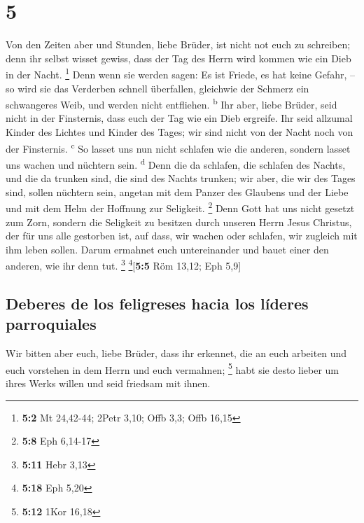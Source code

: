 \hypertarget{section-4}{%
\section{5}\label{section-4}}

 Von den Zeiten aber und Stunden, liebe Brüder, ist nicht
not euch zu schreiben;  denn ihr selbst wisset gewiss,
dass der Tag des Herrn wird kommen wie ein Dieb in der Nacht.
\footnote{\textbf{5:2} Mt 24,42-44; 2Petr 3,10; Offb 3,3; Offb 16,15}
 Denn wenn sie werden sagen: Es ist Friede, es hat keine
Gefahr, -- so wird sie das Verderben schnell überfallen, gleichwie der
Schmerz ein schwangeres Weib, und werden nicht entfliehen.
\textsuperscript{b}  Ihr aber, liebe Brüder, seid nicht in
der Finsternis, dass euch der Tag wie ein Dieb ergreife. 
Ihr seid allzumal Kinder des Lichtes und Kinder des Tages; wir sind
nicht von der Nacht noch von der Finsternis. \textsuperscript{c}
 So lasset uns nun nicht schlafen wie die anderen, sondern
lasset uns wachen und nüchtern sein. \textsuperscript{d} 
Denn die da schlafen, die schlafen des Nachts, und die da trunken sind,
die sind des Nachts trunken;  wir aber, die wir des Tages
sind, sollen nüchtern sein, angetan mit dem Panzer des Glaubens und der
Liebe und mit dem Helm der Hoffnung zur Seligkeit. \footnote{\textbf{5:8}
  Eph 6,14-17}  Denn Gott hat uns nicht gesetzt zum Zorn,
sondern die Seligkeit zu besitzen durch unseren Herrn Jesus Christus,
 der für uns alle gestorben ist, auf dass, wir wachen
oder schlafen, wir zugleich mit ihm leben sollen.  Darum
ermahnet euch untereinander und bauet einer den anderen, wie ihr denn
tut. \footnote{\textbf{5:11} Hebr 3,13} \footnote{\textbf{5:18} Eph 5,20}{[}\textbf{5:5}
Röm 13,12; Eph 5,9{]}

\hypertarget{deberes-de-los-feligreses-hacia-los-luxedderes-parroquiales}{%
\subsection{Deberes de los feligreses hacia los líderes
parroquiales}\label{deberes-de-los-feligreses-hacia-los-luxedderes-parroquiales}}

 Wir bitten aber euch, liebe Brüder, dass ihr erkennet,
die an euch arbeiten und euch vorstehen in dem Herrn und euch vermahnen;
\footnote{\textbf{5:12} 1Kor 16,18}  habt sie desto
lieber um ihres Werks willen und seid friedsam mit ihnen.

